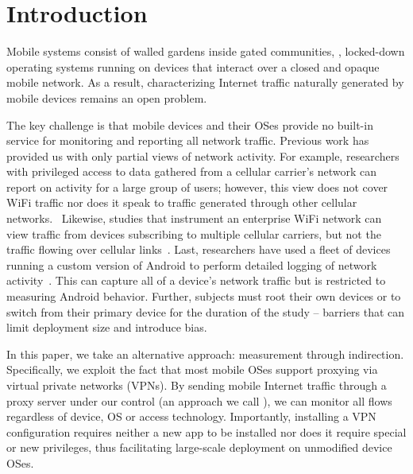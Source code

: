 \section{Introduction}
\label{sec:introduction}


Mobile systems consist of walled gardens inside gated communities, \ie{}, locked-down operating 
systems running on devices that interact over a closed and opaque mobile network. As a result, 
characterizing Internet traffic naturally generated by mobile devices remains an open problem. 

The key challenge is that mobile devices and their OSes provide no built-in service for monitoring and 
reporting all network traffic. Previous work has provided us with only partial views of network activity. 
For example, researchers with privileged access to data gathered from a cellular carrier's network can 
report on activity for a large group of users; however, this view does not cover WiFi traffic nor 
does it speak to traffic generated through other cellular networks.~\cite{anyattstudy} Likewise, studies that instrument 
an enterprise WiFi network can view traffic from devices subscribing to multiple cellular carriers, but not 
the traffic flowing over cellular links~\cite{someonedidthis}. Last, researchers have used a fleet of devices running a 
custom version of Android to perform detailed logging of network activity~\cite{mobilelab}. This can capture all of a device's network 
traffic but is restricted to measuring Android behavior. Further, subjects must root their own devices or to 
switch from their primary device for the duration of the study -- barriers that can limit deployment 
size and introduce bias. 

In this paper, we take an alternative approach: measurement through indirection. Specifically, 
we exploit the fact that most mobile OSes support proxying via virtual private networks (VPNs). 
By sending mobile Internet traffic through a proxy server under our control (an approach we call \platname), we can monitor all 
flows regardless of device, OS or access technology. Importantly, installing a VPN configuration 
requires neither a new app to be installed nor does it require special or new privileges, thus facilitating 
large-scale deployment on unmodified device OSes.

